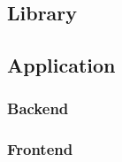 

\subsection{Library}


\subsection{Application}

\subsubsection{Backend}

\subsubsection{Frontend}
 

